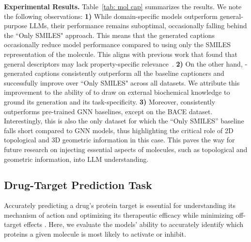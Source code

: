 \textbf{Experimental Results.}
Table~\ref{tab: mol cap} summarizes the results. We note the following observations:
\textbf{1)} While domain-specific models outperform general-purpose LLMs, their performance remains suboptimal, occasionally falling behind the ``Only SMILES" approach. This means that the generated captions occasionally reduce model performance compared to using only the SMILES representation of the molecule. This aligns with previous work that found that general descriptors may lack property-specific relevance~\cite{guo2024moltailor,edwards2024molcap}.
\textbf{2)} On the other hand, \proposed-generated captions consistently outperform all the baseline captioners and successfully improve over ``Only SMILES" across all datasets.
We attribute this improvement to the ability of \proposed to draw on external biochemical knowledge to ground its generation and its task-specificity. %
\textbf{3)} Moreover, \proposed consistently outperforms pre-trained GNN baselines, except on the BACE dataset. 
Interestingly, this is also the only dataset for which the ``Only SMILES'' baseline falls short compared to GNN models, thus 
highlighting the critical role of 2D topological and 3D geometric information in this case.
This paves the way for future research on injecting essential aspects of molecules, such as topological and geometric information, into LLM understanding.



\subsection{Drug-Target Prediction Task}
\label{exp:Protein Target Prediction Task}

Accurately predicting a drug's protein target is essential for understanding its mechanism of action and optimizing its therapeutic efficacy while minimizing off-target effects \cite{santos2017comprehensive,batool2019structure}.
Here, we evaluate the models' ability to accurately identify which proteins a given molecule is most likely to activate or inhibit. 

